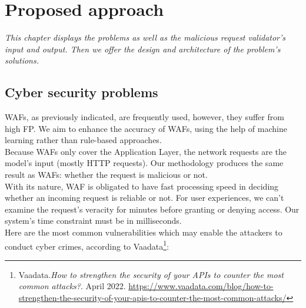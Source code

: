\chapter{Proposed approach}
\label{chap:proposed_approach}
	\textit{This chapter displays the problems as well as the malicious request validator's input and output. Then we offer the design and architecture of the problem's solutions.}
\minitoc

\section{Cyber security problems}
\label{Cyber problems}
WAFs, as previously indicated, are frequently used, however, they suffer from high FP. We aim to enhance the accuracy of WAFs, using the help of machine learning rather than rule-based approaches.  \\
Because WAFs only cover the Application Layer, the network requests are the model's input (mostly HTTP requests). Our methodology produces the same result as WAFs: whether the request is malicious or not.\\
With its nature, WAF is obligated to have fast processing speed in deciding whether an incoming request is reliable or not. For user experiences, we can't examine the request's veracity for minutes before granting or denying access. Our system's time constraint must be in milliseconds.\\
Here are the most common vulnerabilities which may enable the attackers to conduct cyber crimes, according to Vaadata\footnote{Vaadata.\textit{How to strengthen the security of your APIs to counter the most common attacks?}. April 2022.
\url{https://www.vaadata.com/blog/how-to-strengthen-the-security-of-your-apis-to-counter-the-most-common-attacks/}}:
